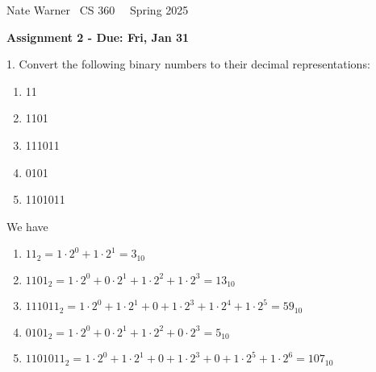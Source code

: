 \documentclass{report}
\title{\Huge{}}
\author{\huge{Nathan Warner}}
\date{\huge{}}
\begin{document}
    \pagebreak \bigbreak \noindent
    Nate Warner \ \quad \quad \quad \quad \quad \quad \quad \quad \quad \quad \quad \quad  CS 360 \quad  \quad \quad \quad \quad \quad \quad \quad \quad \ \ \quad \quad Spring 2025
    \begin{center}
        \textbf{Assignment 2 - Due: Fri, Jan 31}
    \end{center}
    \bigbreak \noindent 
    \begin{mdframed}
        1. Convert the following binary numbers to their decimal representations:
        \begin{enumerate}[label=\alph*.]
            \item 11
            \item 1101
            \item 111011
            \item 0101
            \item 1101011
        \end{enumerate}
    \end{mdframed}
    \bigbreak \noindent 
    We have
    \begin{enumerate}[label=(\alph*)]
        \item $11_{2} = 1 \cdot 2^{0} + 1\cdot 2^{1} = 3_{10} $
        \item $1101_{2} = 1\cdot 2^{0} + 0 \cdot 2^{1} + 1\cdot 2^{2} + 1\cdot 2^{3}  = 13_{10}$
        \item $111011_{2} =  1 \cdot 2^{0} + 1\cdot 2^{1} + 0 + 1\cdot 2^{3} + 1\cdot 2^{4} + 1\cdot 2^{5} = 59_{10}$
        \item $0101_{2} = 1 \cdot 2^{0} + 0 \cdot 2^{1} + 1 \cdot 2 ^{2} + 0 \cdot 2^{3} = 5_{10}$
        \item $1101011_{2} = 1 \cdot 2^{0} + 1\cdot 2^{1} + 0 + 1\cdot 2^{3} + 0 + 1\cdot 2^{5} + 1 \cdot 2^{6} = 107_{10}  $
    \end{enumerate}
\end{document}
